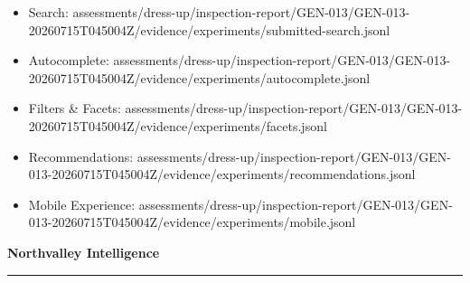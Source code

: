 \documentclass[10pt]{article}
\newcommand{\ReportFine}[1]{{\fontsize{7.6}{9.1}\selectfont\color{NVIMuted}#1}}
\begin{document}
\begin{itemize}
\item \ReportFine{Search: assessments/dress-up/inspection-report/GEN-013/GEN-013-20260715T045004Z/evidence/experiments/submitted-search.jsonl}
\item \ReportFine{Autocomplete: assessments/dress-up/inspection-report/GEN-013/GEN-013-20260715T045004Z/evidence/experiments/autocomplete.jsonl}
\item \ReportFine{Filters \& Facets: assessments/dress-up/inspection-report/GEN-013/GEN-013-20260715T045004Z/evidence/experiments/facets.jsonl}
\item \ReportFine{Recommendations: assessments/dress-up/inspection-report/GEN-013/GEN-013-20260715T045004Z/evidence/experiments/recommendations.jsonl}
\item \ReportFine{Mobile Experience: assessments/dress-up/inspection-report/GEN-013/GEN-013-20260715T045004Z/evidence/experiments/mobile.jsonl}
\end{itemize}
\vfill
\begin{center}
{\fontsize{16}{19}\selectfont\bfseries\color{NVIInk}Northvalley Intelligence}\\[0.06in]
{\color{NVIAccent}\rule{2.2in}{0.8pt}}\\[0.08in]
\ReportFine{\NorthvalleyContactLine}
\end{center}
\end{document}
